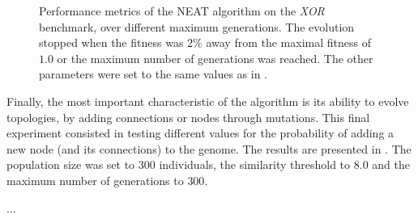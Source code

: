 \begin{figure}
\begin{center}
    \end{center}
    \caption{Performance metrics of the NEAT algorithm on the \textit{XOR} benchmark, over different maximum generations.
    The evolution stopped when the fitness was $2\%$ away from the maximal fitness of $1.0$ or the maximum number of generations was reached.
    The other parameters were set to the same values as in \cite{neat}.}
    \label{fig:neat_xor_generations}
\end{figure}

Finally, the most important characteristic of the algorithm is its ability to evolve topologies, by adding connections or nodes through mutations. This final experiment consisted in testing different
values for the probability of adding a new node (and its connections) to the genome. The results are presented in . The population size was set to $300$ individuals,
the similarity threshold to $8.0$ and the maximum number of generations to $300$.

...

